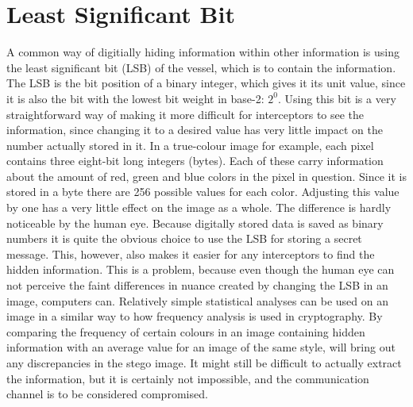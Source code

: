 \section{Least Significant Bit}
A common way of digitially hiding information within other information is using the least significant bit (LSB) of the vessel, which is to contain the information. 
The LSB is the bit position of a binary integer, which gives it its unit value, since it is also the bit with the lowest bit weight in base-2: $2^0$.
Using this bit is a very straightforward way of making it more difficult for interceptors to see the information, since changing it to a desired value has very little impact on the number actually stored in it.
In a true-colour image for example, each pixel contains three eight-bit long integers (bytes). Each of these carry information about the amount of red, green and blue colors in the pixel in question.
Since it is stored in a byte there are 256 possible values for each color. Adjusting this value by one has a very little effect on the image as a whole. The difference is hardly noticeable by the human eye.
Because digitally stored data is saved as binary numbers it is quite the obvious choice to use the LSB for storing a secret message. This, however, also makes it easier for any interceptors to find the hidden information.
This is a problem, because even though the human eye can not perceive the  faint differences in nuance created by changing the LSB in an image, computers can. 
Relatively simple statistical analyses can be used on an image in a similar way to how frequency analysis is used in cryptography. 
By comparing the frequency of certain colours in an image containing hidden information with an average value for an image of the same style, will bring out any discrepancies in the stego image. 
It might still be difficult to actually extract the information, but it is certainly not impossible, and the communication channel is to be considered compromised.